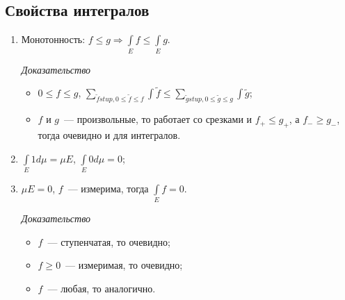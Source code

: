 \documentclass{article}
\begin{document}
    \subsection{Свойства интегралов}
    
        \begin{enumerate}
        
            \item Монотонность: $f \leqslant g \Rightarrow \int\limits_{E} f \leqslant \int\limits_{E} g$.
            
                \textit{Доказательство}
                
                    \begin{itemize}
                    
                        \item $0 \leqslant f \leqslant g$, $\sum\limits_{\widetilde{f} stup, 0 \leqslant \widetilde{f} \leqslant f} \int \widetilde{f} \leqslant \sum\limits_{\widetilde{g} stup, 0 \leqslant \widetilde{g} \leqslant g} \int \widetilde{g}$;
                        
                        \item $f$ и $g$~--- произвольные, то работает со срезками и $f_+ \leqslant g_+$, а $f_- \geqslant g_-$, тогда очевидно и для интегралов.
                        
                    \end{itemize}
            
            \item $\int\limits_{E} 1 d \mu = \mu E$, $\int\limits_{E} 0 d \mu = 0$;
            
            \item $\mu E = 0$, $f$~--- измерима, тогда $\int\limits_{E} f = 0$.
            
                \textit{Доказательство}
                
                    \begin{itemize}
                    
                        \item $f$~--- ступенчатая, то очевидно;
                        
                        \item $f \geqslant 0$~--- измеримая, то очевидно;
                        
                        \item $f$~--- любая, то аналогично.
                        

\end{itemize}
\end{enumerate}
\end{document}
